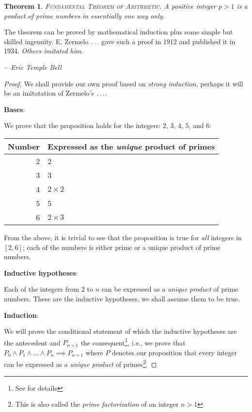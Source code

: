 \documentclass[a4paper]{article}
\newtheorem{theorem}{Theorem}
\begin{document}
\begin{theorem}
    \label{theorem: fta}
    \textsc{Fundamental Theorem of Arithmetic}. A positive integer $p>1$ is a product of prime numbers in essentially one way only.
\end{theorem}
\epigraph
{
    The theorem can be proved by mathematical induction plus some simple but skilled ingenuity. E. Zermelo $\mathellipsis$ gave such a proof in 1912 and published it in 1934. \emph{Others imitated him}.
}
{
    ---\textit{Eric Temple Bell \cite{math-queen-servant}}
}
\begin{proof}
    We shall provide our own proof based on \emph{strong induction}, perhaps it will be an imitatation of Zermelo's $\mathellipsis$.

\noindent\textbf{Bases}:
        
        We prove that the proposition holds for the integers: 2, 3, 4, 5, and 6:
        \begin{center}
            \begin{tabular}{|r|l|}
            \hline
                Number & Expressed as the \emph{unique} product of primes\\
            \hline
            2 & 2\\
            \hline
            3 & 3\\
            \hline
            4 & $2\times 2$\\
            \hline
            5 & 5\\
            \hline
            6 & $2\times 3$\\
            \hline
            \end{tabular}
        \end{center}
        From the above, it is trivial to see that the proposition is true for \emph{all} integers in $[2, 6]$; each of the numbers is either prime or a unique product of prime numbers. 

\noindent\textbf{Inductive hypotheses}:

        Each of the integers from $2$ to $n$ can be expressed as a \emph{unique product} of prime numbers.  These are the inductive hypotheses, we shall assume them to be true.
        
\noindent\textbf{Induction}:

        We will prove the conditional statement of which the inductive hypotheses are the antecedent and $P_{n+1}$ the consequent\footnote{See \cite{suber-math-ind} for details}, i.e., we prove that $P_0 \wedge P_1 \wedge \dots \wedge P_n \implies P_{n+1}$ where $P$ denotes our proposition that every integer can be expressed as a \emph{unique product} of primes\footnote{This is also called the \emph{prime factorization} of an integer $n > 1$}.


\end{proof}
\end{document}
